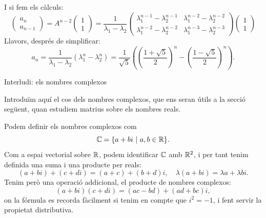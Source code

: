 \documentclass[
  11pt,
]{book}
\makeatletter
\numberwithin{dummy}{section}
\theoremstyle{maincolornumbox}
\theoremstyle{blacknumex}
\theoremstyle{blacknumbox}
\theoremstyle{maincolornum}
\renewcommand{\section}{\@startsection{section}{1}{\z@}
{-4ex \@plus -1ex \@minus -.4ex}
{1ex \@plus.2ex }
{\normalfont\large\sffamily\bfseries}}
\newlength\esp
\makeatother
\begin{document}
\[%
\] I si fem els càlculs: \[\begin{pmatrix}
a_n\\a_{n-1}
\end{pmatrix}=
A^{n-2} \begin{pmatrix} 1 \\ 1 \end{pmatrix}=
\frac{1}{\lambda_1-\lambda_2} \begin{pmatrix}
\lambda_1^{n-1}-\lambda_2^{n-1} &
\lambda_1^{n-2}-\lambda_2^{n-2} \\
\lambda_1^{n-2}-\lambda_2^{n-2} &
\lambda_1^{n-3}-\lambda_2^{n-3} 
\end{pmatrix}\begin{pmatrix} 1 \\ 1 \end{pmatrix}
\] Llavors, després de simplificar:
\[a_n= \frac{1}{\lambda_1-\lambda_2}(\lambda_1^n-\lambda_2^n)=\frac{1}{\sqrt{5}}\left(
\left(\frac{1+\sqrt{5}}{2}\right)^n-\left(\frac{1-\sqrt{5}}{2}\right)^n
\right).
\]

\hypertarget{sec:complexos}{%
\section{Interludi: els nombres complexos}\label{sec:complexos}}

Introduïm aquí el cos dels nombres complexos, que ens seran útils a la
secció següent, quan estudiem matrius sobre els nombres reals.

Podem definir els nombres complexos com \[\mathbb{C} =\{a+bi ~|~ a,b\in\mathbb{R}\}.\]
Com a espai vectorial sobre \(\mathbb{R}\), podem identificar \(\mathbb{C}\) amb \(\mathbb{R}^2\), i
per tant tenim definida una suma i una producte per reals:
\[(a+bi) + (c+di) = (a+c) + (b+d)i, \quad \lambda(a+bi)=\lambda a + \lambda b i.\]
Tenim però una operació addicional, el producte de nombres complexos:
\[(a+bi)(c+di) = (ac-bd) + (ad+bc)i,\] on la fórmula es recorda
fàcilment si tenim en compte que \(i^2=-1\), i fent servir la propietat
distributiva.
\end{document}
